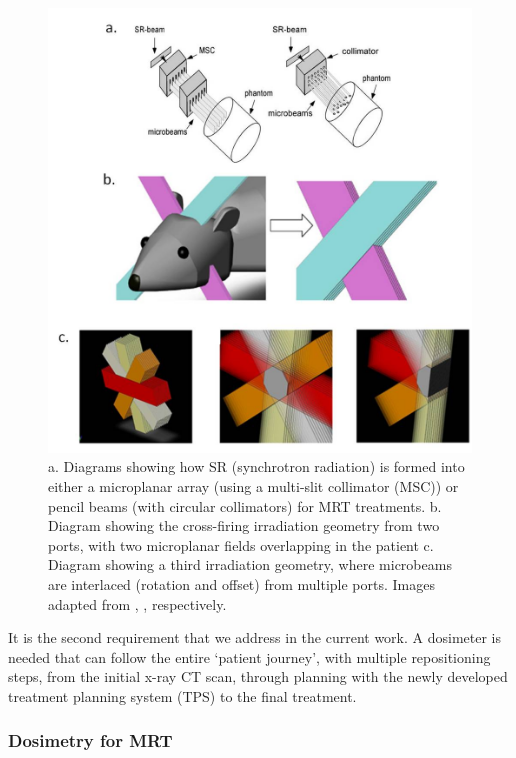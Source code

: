 	
\begin{figure}
\centering
\includegraphics[width=\linewidth]{mrt_img/MRT_geometries}
\caption{a. Diagrams showing how SR (synchrotron radiation) is formed into either a microplanar  array (using a multi-slit collimator (MSC)) or pencil beams (with circular collimators) for MRT treatments. b. Diagram showing the cross-firing irradiation geometry from two ports, with two microplanar fields overlapping in the patient c. Diagram showing a third irradiation geometry, where microbeams are interlaced (rotation and offset) from multiple ports. Images adapted from \cite{siegbahndetermination2006}, \cite{brauer-krischnew2005}, \cite{serduchigh-precision2010} respectively.}
\label{fig:MRT_geometries}
\end{figure}
	
	It is the second requirement that we address in the current work. 
	A dosimeter is needed that can follow the entire `patient journey', with multiple repositioning steps, from the initial x-ray CT scan, through planning with the newly developed treatment planning system (TPS) to the final treatment. 
	
	
	\subsubsection{Dosimetry for MRT}
	
